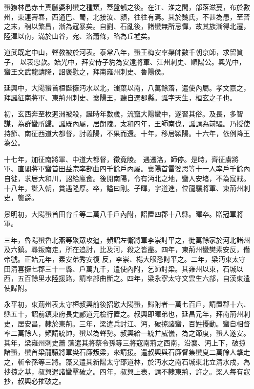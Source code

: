 
\begin{pinyinscope}

 蠻獠林邑赤土真臘婆利蠻之種類，蓋盤瓠之後。在江、淮之間，部落滋蔓，布於數州，東連壽春，西通巴、蜀，北接汝、潁，往往有焉。其於魏氏，不甚為患，至晉之末，稍以繁昌，漸為寇暴矣。自劉、石亂後，諸蠻無所忌憚，故其族漸得北遷，陸渾以南，滿於山谷，宛、洛蕭條，略為丘墟矣。



 道武既定中山，聲教被於河表。泰常八年，蠻王梅安率渠帥數千朝京師，求留質子，
 以表忠款。始光中，拜安侍子豹為安遠將軍、江州刺史、順陽公。興光中，蠻王文武龍請降，詔褒慰之，拜南雍州刺史、魯陽侯。



 延興中，大陽蠻首桓誕擁沔水以北，滍葉以南，八萬餘落，遣使內屬。孝文嘉之，拜誕征南將軍、東荊州刺史、襄陽王，聽自選郡縣。誕字天生，桓玄之子也。



 初，玄西奔至枚迥洲被殺，誕時年數歲，流竄大陽蠻中，遂習其俗。及長，多智謀，為群蠻所歸。誕既內屬，居朗陵。太和四年，王師南伐，誕請為前驅。乃授使持節、南征西道大都督，討義陽，不果而還。十年，移居潁陽。十六年，依例降王為公。



 十七年，加征南將軍、中道大都督，徵竟陵。
 遇遷洛，師停。是時，齊征虜將軍、直閣將軍蠻首田益宗率部曲四千餘戶內屬。襄陽首雷婆思等十一人率戶千餘內自徙，求居大和川，詔給廩食。後開南陽，令有沔北之地，蠻人安堵，不為寇賊。十八年，誕入朝，賞遇隆厚。卒，謚曰剛。子暉，字道進，位龍驤將軍、東荊州刺史，襲爵。



 景明初，大陽蠻首田育丘等二萬八千戶內附，詔置四郡十八縣。暉卒。贈冠軍將軍。



 三年，魯陽蠻魯北燕等聚眾攻逼，頻詔左衛將軍李崇討平之，徙萬餘家於河北諸州及六鎮。尋叛南走，所在追討，比及河，殺之皆盡。四年，東荊州蠻樊素安反，僭帝號。正始元年，素安弟秀安復
 反，李崇、楊大眼悉討平之。二年，梁沔東太守田清喜擁七郡三十一縣、戶萬九千，遣使內附，乞師討梁。其雍州以東，石城以西，五百餘里水陸援路，請率部曲斷之。四年，梁永寧太守文雲生六部，自漢東遣使歸附。



 永平初，東荊州表太守桓叔興前後招慰大陽蠻，歸附者一萬七百戶，請置郡十六、縣五十，詔前鎮東府長史酈道元檢行置之。叔興即暉弟也，延昌元年，拜南荊州刺史，居安昌，隸於東荊。三年，梁遣兵討江、沔，破掠諸蠻，百姓擾動。蠻自相督率二萬餘人，頻請統帥，蠻以為聲勢。叔興給一統并威儀，為之節度，蠻人遂安。其年，梁雍州刺史蕭
 藻遣其將蔡令孫等三將寇南荊之西南，沿襄、沔上下，破掠諸蠻，蠻首梁龍驤將軍樊石廉叛梁，來請援。遣叔興與石廉督集蠻夏二萬餘人擊走之，斬令孫等三將。藻又遣其新陽太守邵道林，於沔水之南石城東北立清水戍，為抄掠之基，叔興遣諸蠻擊破之。四年，叔興上表，請不隸東荊，許之。梁人每有寇抄，叔興必摧破之。




\end{pinyinscope}
